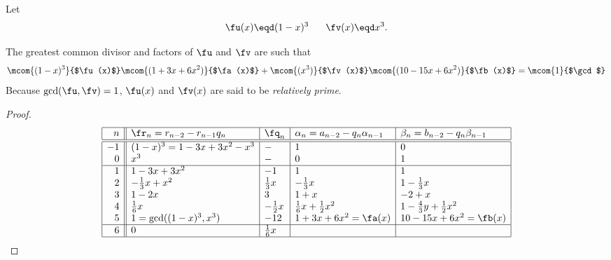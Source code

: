 \begin{example}
\label{ex:eea_n=3}
Let 
  \[ \fu(x)\eqd (1-x)^3  \hspace{4ex} \fv(x)\eqd x^3. \]

The greatest common divisor and factors of $\fu$ and $\fv$ are such that
\[ 
   \mcom{(1-x)^3}{$\fu(x)$} \mcom{(1+3x+6x^2)}{$\fa(x)$}   +
   \mcom{(x^3)  }{$\fv(x)$} \mcom{(10-15x+6x^2)}{$\fb(x)$} = 
   \mcom{1}{$\gcd$}
\]
Because $\gcd(\fu,\fv)=1$, $\fu(x)$ and $\fv(x)$ are said to be 
{\em relatively prime}.
\end{example}
\begin{proof}
\[\begin{array}{|r||l|l|l|l|}
  \hline
  n  & \fr_n=r_{n-2}-r_{n-1}q_n  & \fq_n   & \alpha_n=a_{n-2}-q_n \alpha_{n-1} & \beta_n=b_{n-2}-q_n \beta_{n-1}  \\
  \hline
  \hline
  -1  & (1-x)^3=1-3x+3x^2-x^3   
      & - 
      & 1 
      & 0  
      \\
   0  & x^3      
      & - 
      & 0 
      & 1  
      \\
  \hline
   1  & 1-3x+3x^2
      & -1  
      &  1
      &  1
      \\
   2  & -\frac{1}{3}x + x^2
      & \frac{1}{3}x
      & -\frac{1}{3}x
      & 1-\frac{1}{3}x
      \\
   3  & 1 -2x
      & 3
      & 1+x
      & -2+x
      \\
   4  & \frac{1}{6}x
      & -\frac{1}{2}x
      & \frac{1}{6}x + \frac{1}{2}x^2
      & 1-\frac{4}{3}y+\frac{1}{2}x^2
      \\
   5  & 1 = \gcd((1-x)^3,x^3)
      & -12
      & 1+3x+6x^2 = \fa(x)
      & 10-15x+6x^2 = \fb(x)
      \\
      \hline
   6  & 0
      & \frac{1}{6}x
      & 
      & 
      \\
  \hline
\end{array}\]
\end{proof}



